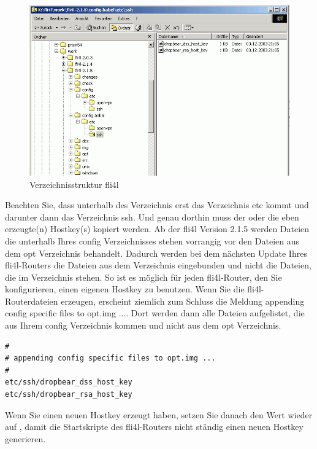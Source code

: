 \begin{description}
  \begin{figure}[htbp]
    \centering
    \includegraphics[width=\columnwidth]{etc_ssh_dir}
    \caption{Verzeichnisstruktur fli4l}
    \label{fig:etc_ssh_dir}
  \end{figure}

  Beachten Sie, dass unterhalb des  Verzeichnis 
  erst das Verzeichnis etc kommt und darunter dann das Verzeichnis ssh. Und
  genau dorthin muss der oder die eben erzeugte(n) Hostkey(s) kopiert
  werden. Ab der fli4l Version 2.1.5 werden Dateien die unterhalb
  Ihres config Verzeichnisses stehen vorrangig vor den Dateien aus dem
  opt Verzeichnis behandelt. Dadurch werden bei dem nächsten Update
  Ihres fli4l-Routers die Dateien aus dem Verzeichnis 
  eingebunden und nicht die Dateien, die im Verzeichnis 
  stehen. So ist es möglich für jeden fli4l-Router, den Sie
  konfigurieren, einen eigenen Hostkey zu benutzen. Wenn Sie die
  fli4l-Routerdateien erzeugen, erscheint ziemlich zum Schluss die
  Meldung \glqq{}appending config specific files to opt.img ...\grqq{}.
  Dort werden dann alle Dateien aufgelistet, die aus Ihrem
  config Verzeichnis kommen und nicht aus dem opt Verzeichnis.

\begin{verbatim}
#
# appending config specific files to opt.img ...
#
etc/ssh/dropbear_dss_host_key
etc/ssh/dropbear_rsa_host_key
\end{verbatim}

  Wenn Sie einen neuen Hostkey erzeugt haben, setzen Sie danach den
  Wert  wieder auf , damit die
  Startskripte des fli4l-Routers nicht ständig einen neuen Hostkey generieren.


\end{description}
